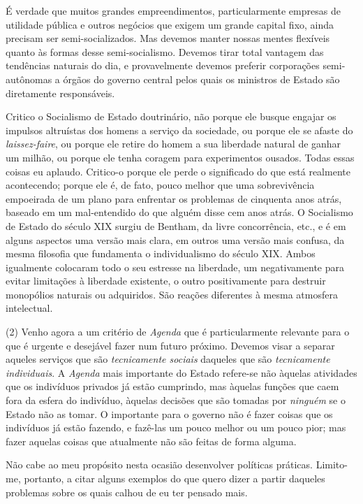 \documentclass[12pt]{article}
\begin{document}
É verdade que muitos grandes empreendimentos, particularmente empresas de utilidade pública e outros negócios que exigem um grande capital fixo, ainda precisam ser semi-socializados. Mas devemos manter nossas mentes flexíveis quanto às formas desse semi-socialismo. Devemos tirar total vantagem das tendências naturais do dia, e provavelmente devemos preferir corporações semi-autônomas a órgãos do governo central pelos quais os ministros de Estado são diretamente responsáveis.

Critico o Socialismo de Estado doutrinário, não porque ele busque engajar os impulsos altruístas dos homens a serviço da sociedade, ou porque ele se afaste do \textit{laissez-faire}, ou porque ele retire do homem a sua liberdade natural de ganhar um milhão, ou porque ele tenha coragem para experimentos ousados. Todas essas coisas eu aplaudo. Critico-o porque ele perde o significado do que está realmente acontecendo; porque ele é, de fato, pouco melhor que uma sobrevivência empoeirada de um plano para enfrentar os problemas de cinquenta anos atrás, baseado em um mal-entendido do que alguém disse cem anos atrás. O Socialismo de Estado do século XIX surgiu de Bentham, da livre concorrência, etc., e é em alguns aspectos uma versão mais clara, em outros uma versão mais confusa, da mesma filosofia que fundamenta o individualismo do século XIX. Ambos igualmente colocaram todo o seu estresse na liberdade, um negativamente para evitar limitações à liberdade existente, o outro positivamente para destruir monopólios naturais ou adquiridos. São reações diferentes à mesma atmosfera intelectual.

(2) Venho agora a um critério de \textit{Agenda} que é particularmente relevante para o que é urgente e desejável fazer num futuro próximo. Devemos visar a separar aqueles serviços que são \textit{tecnicamente sociais} daqueles que são \textit{tecnicamente individuais}. A \textit{Agenda} mais importante do Estado refere-se não àquelas atividades que os indivíduos privados já estão cumprindo, mas àquelas funções que caem fora da esfera do indivíduo, àquelas decisões que são tomadas por \textit{ninguém} se o Estado não as tomar. O importante para o governo não é fazer coisas que os indivíduos já estão fazendo, e fazê-las um pouco melhor ou um pouco pior; mas fazer aquelas coisas que atualmente não são feitas de forma alguma.

Não cabe ao meu propósito nesta ocasião desenvolver políticas práticas. Limito-me, portanto, a citar alguns exemplos do que quero dizer a partir daqueles problemas sobre os quais calhou de eu ter pensado mais.
\end{document}
